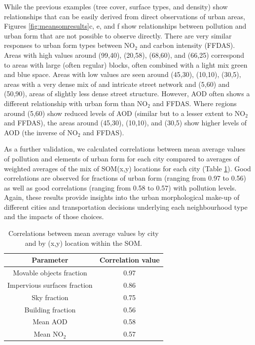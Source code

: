 \documentclass[9pt,twocolumn,twoside,lineno]{pnas-new}
\begin{document}
While the previous examples (tree cover, surface types, and density) show relationships that can be easily derived from direct observations of urban areas, Figures \ref{fig:meansomresults}c, e, and f show relationships between pollution and urban form that are not possible to observe directly. There are very similar responses to urban form types between NO$_{2}$ and carbon intensity (FFDAS). Areas with high values around (99,40), (20,58), (68,60), and (66,25) correspond to areas with large (often regular) blocks, often combined with a light mix green and blue space. Areas with low values are seen around (45,30), (10,10), (30,5), areas with a very dense mix of and intricate street network and (5,60) and (50,90), areas of slightly less dense street structure. However, AOD often shows a different relationship with urban form than NO$_{2}$ and FFDAS. Where regions around (5,60) show reduced levels of AOD (similar but to a lesser extent to NO$_{2}$ and FFDAS), the areas around (45,30), (10,10), and (30,5) show higher levels of AOD (the inverse of NO$_{2}$ and FFDAS). 

As a further validation, we calculated correlations between mean average values of pollution and elements of urban form for each city compared to averages of weighted averages of the mix of SOM(x,y) locations for each city (Table \ref{table:correlations}). Good correlations are observed for fractions of urban form (ranging from 0.97 to 0.56) as well as good correlations (ranging from 0.58 to 0.57) with pollution levels. Again, these results provide insights into the urban morphological make-up of different cities and transportation decisions underlying each neighbourhood type and the impacts of those choices.

\begin{table}
\centering
\caption{Correlations between mean average values by city and by (x,y) location within the SOM.}\label{table:correlations}
\begin{tabular}{ | c | c |}
\hline \textbf{Parameter} & \textbf{Correlation value}\\ \hline
Movable objects fraction& 0.97 \\ \hline
Impervious surfaces fraction& 0.86 \\ \hline
Sky fraction& 0.75 \\ \hline
Building fraction& 0.56 \\ \hline
Mean AOD& 0.58 \\ \hline
Mean NO$_{2}$&0.57 \\ \hline
\end{tabular}
\end{table}
\end{document}
